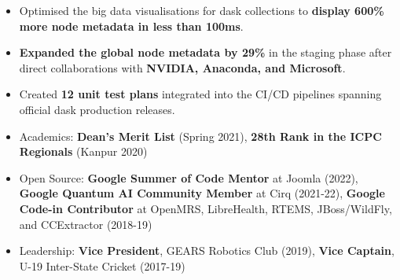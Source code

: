 \documentclass[10pt,a4paper,ragged2e,withhyper]{freycv}
\begin{document}
\begin{paracol}{1}
	\medskip
	
	\begin{itemize}
		\item Optimised the big data visualisations for dask collections to \textbf{display 600\% more node metadata in less than 100ms}\href{https://summerofcode.withgoogle.com/archive/2021/projects/4961535251709952}{\faExternalLink*}.
		\item \textbf{Expanded the global node metadata by 29\%} in the staging phase after direct collaborations with \textbf{NVIDIA, Anaconda, and Microsoft}.
		\item Created \textbf{12 unit test plans} integrated into the CI/CD pipelines spanning official dask production releases.
		      
	\end{itemize}
	
	
	\switchcolumn
	
	
	\begin{itemize}
		\item Academics: \textbf{Dean's Merit List} (Spring 2021), \textbf{28th Rank in the ICPC Regionals}\href{https://kanpur.indiaicpc.in/Result.pdf}{\faExternalLink*} (Kanpur 2020)
		\item Open Source: \textbf{Google Summer of Code Mentor} \href{https://summerofcode.withgoogle.com/programs/2022/projects/XJwp022t}{\faExternalLink*} at Joomla (2022), \textbf{Google Quantum AI Community Member} \href{https://github.com/quantumlib/Cirq}{\faExternalLink*} at Cirq (2021-22), \textbf{Google Code-in Contributor} at OpenMRS, LibreHealth, RTEMS, JBoss/WildFly, and CCExtractor (2018-19)
	\item Leadership: \textbf{Vice President}, GEARS Robotics Club (2019), \textbf{Vice Captain}, U-19 Inter-State Cricket (2017-19)
	\end{itemize}
	        



\end{paracol}
\end{document}

